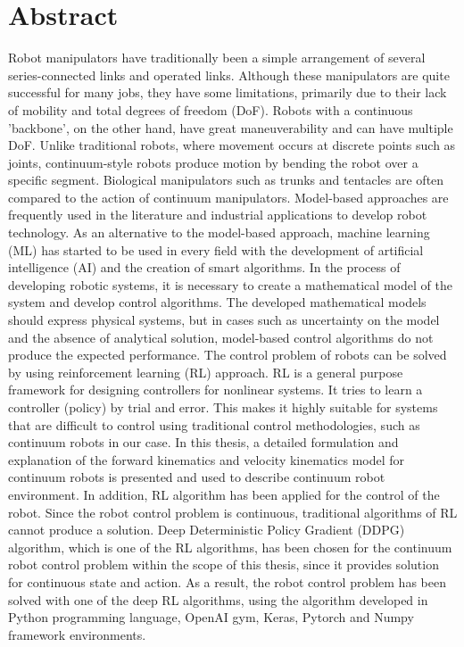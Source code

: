 \documentclass[12pt,twoside,a4]{mwbk}
\begin{document}
\chapter{Abstract}
Robot manipulators have traditionally been a simple arrangement of several series-connected links and operated links. Although these manipulators are quite successful for many jobs, they have some limitations, primarily due to their lack of mobility and total degrees of freedom (DoF). Robots with a continuous 'backbone', on the other hand, have great maneuverability and can have multiple DoF. Unlike traditional robots, where movement occurs at discrete points such as joints, continuum-style robots produce motion by bending the robot over a specific segment. Biological manipulators such as trunks and tentacles are often compared to the action of continuum manipulators. Model-based approaches are frequently used in the literature and industrial applications to develop robot technology. As an alternative to the model-based approach, machine learning (ML) has started to be used in every field with the development of artificial intelligence (AI) and the creation of smart algorithms. In the process of developing robotic systems, it is necessary to create a mathematical model of the system and develop control algorithms. The developed mathematical models should express physical systems, but in cases such as uncertainty on the model and the absence of analytical solution, model-based control algorithms do not produce the expected performance. The control problem of robots can be solved by using reinforcement learning (RL) approach. RL is a general purpose framework for designing controllers for nonlinear systems. It tries to learn a controller (policy) by trial and error. This makes it highly suitable for systems that are difficult to control using traditional control methodologies, such as continuum robots in our case. In this thesis, a detailed formulation and explanation of the forward kinematics and velocity kinematics model for continuum robots is presented and used to describe continuum robot environment. In addition, RL algorithm has been applied for the control of the robot. Since the robot control problem is continuous, traditional algorithms of RL cannot produce a solution. Deep Deterministic Policy Gradient (DDPG) algorithm, which is one of the RL algorithms, has been chosen for the continuum robot control problem within the scope of this thesis, since it provides solution for continuous state and action. As a result, the robot control problem has been solved with one of the deep RL algorithms, using the algorithm developed in Python programming language, OpenAI gym, Keras, Pytorch and Numpy framework environments.
\end{document}
